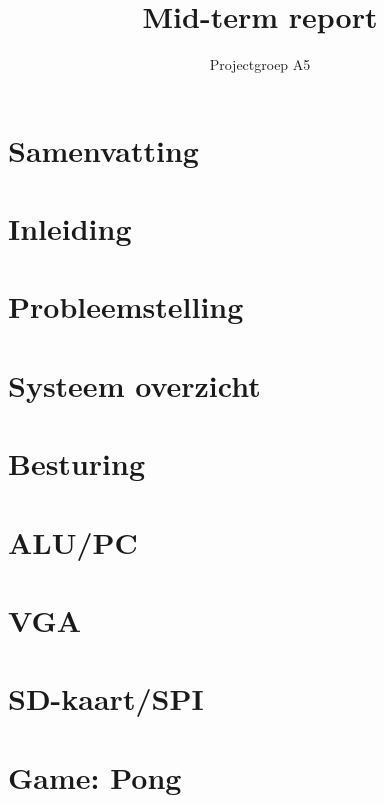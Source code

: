 


\frontmatter

\title{Mid-term report}
\author{Projectgroep A5}
\maketitle
\chapter{Samenvatting}


\chapter{Inleiding}
\newpage

\chapter{Probleemstelling}
\newpage

\chapter{Systeem overzicht}
\newpage

\chapter{Besturing}
\newpage


\chapter{ALU/PC}
\newpage

\chapter{VGA}
\newpage

\chapter{SD-kaart/SPI}
\newpage

\chapter{Game: Pong}

